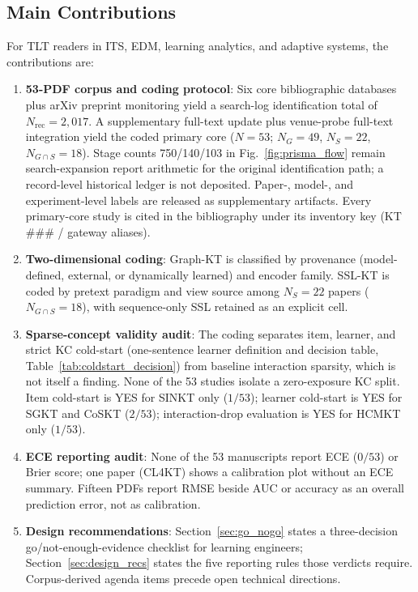 \documentclass[lettersize,journal]{IEEEtran}
\begin{document}
\subsection{Main Contributions}
For TLT readers in ITS, EDM, learning analytics, and adaptive systems, the contributions are:
\begin{enumerate}
    \item \textbf{53-PDF corpus and coding protocol}: Six core bibliographic databases plus arXiv preprint monitoring yield a search-log identification total of $N_{\mathrm{rec}}=2{,}017$. A supplementary full-text update plus venue-probe full-text integration yield the coded primary core ($N=53$; $N_G=49$, $N_S=22$, $N_{G \cap S}=18$). Stage counts 750/140/103 in Fig.~\ref{fig:prisma_flow} remain search-expansion report arithmetic for the original identification path; a record-level historical ledger is not deposited. Paper-, model-, and experiment-level labels are released as supplementary artifacts. Every primary-core study is cited in the bibliography under its inventory key (KT$\#\#\#$ / gateway aliases).
    \item \textbf{Two-dimensional coding}: Graph-KT is classified by provenance (model-defined, external, or dynamically learned) and encoder family. SSL-KT is coded by pretext paradigm and view source among $N_S=22$ papers ($N_{G\cap S}=18$), with sequence-only SSL retained as an explicit cell.
    \item \textbf{Sparse-concept validity audit}: The coding separates item, learner, and strict KC cold-start (one-sentence learner definition and decision table, Table~\ref{tab:coldstart_decision}) from baseline interaction sparsity, which is not itself a finding. None of the 53 studies isolate a zero-exposure KC split. Item cold-start is YES for SINKT only ($1/53$); learner cold-start is YES for SGKT and CoSKT ($2/53$); interaction-drop evaluation is YES for HCMKT only ($1/53$).
    \item \textbf{ECE reporting audit}: None of the 53 manuscripts report ECE ($0/53$) or Brier score; one paper (CL4KT) shows a calibration plot without an ECE summary. Fifteen PDFs report RMSE beside AUC or accuracy as an overall prediction error, not as calibration.
    \item \textbf{Design recommendations}: Section~\ref{sec:go_nogo} states a three-decision go/not-enough-evidence checklist for learning engineers; Section~\ref{sec:design_recs} states the five reporting rules those verdicts require. Corpus-derived agenda items precede open technical directions.
\end{enumerate}
\end{document}

